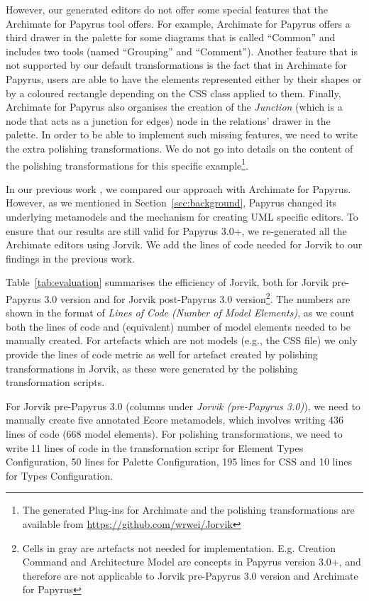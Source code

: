 However, our generated editors do not offer some special features that the Archimate for Papyrus tool offers. 
For example, Archimate for Papyrus offers a third drawer in the palette for some diagrams that is called ``Common'' and includes two tools (named ``Grouping'' and ``Comment''). 
Another feature that is not supported by our default transformations is the fact that in Archimate for Papyrus, users are able to have the elements represented either by their shapes or by a coloured rectangle depending on the CSS class applied to them. 
Finally, Archimate for Papyrus also organises the creation of the \textit{Junction} (which is a node that acts as a junction for edges) node in the relations' drawer in the palette.
In order to be able to implement such missing features, we need to write the extra polishing transformations. 
We do not go into details on the content of the polishing transformations for this specific example\footnote{The generated Plug-ins for Archimate and the polishing transformations are available from \url{https://github.com/wrwei/Jorvik}}.

In our previous work \cite{zolotas2018towards}, we compared our approach with Archimate for Papyrus. 
However, as we mentioned in Section~\ref{sec:background}, Papyrus changed its underlying metamodels and the mechanism for creating UML specific editors. 
To ensure that our results are still valid for Papyrus 3.0+, we re-generated all the Archimate editors using Jorvik. 
We add the lines of code needed for Jorvik to our findings in the previous work.

Table~\ref{tab:evaluation} summarises the efficiency of Jorvik, both for Jorvik pre-Papyrus 3.0 version and for Jorvik post-Papyrus 3.0 version\footnote{Cells in gray are artefacts not needed for implementation. E.g. Creation Command and Architecture Model are concepts in Papyrus version 3.0+, and therefore are not applicable to Jorvik pre-Papyrus 3.0 version and Archimate for Papyrus}. The numbers are shown in the format of \textit{Lines of Code (Number of Model Elements)}, as we count both the lines of code and (equivalent) number of model elements needed to be manually created. For artefacts which are not models (e.g., the CSS file) we only provide the lines of code metric as well for artefact created by polishing transformations in Jorvik, as these were generated by the polishing transformation scripts.

For Jorvik pre-Papyrus 3.0 (columns under \textit{Jorvik (pre-Papyrus 3.0)}), we need to manually create five annotated Ecore metamodels, which involves writing 436 lines of code (668 model elements). 
For polishing transformations, we need to write 11 lines of code in the transfornation scripr for Element Types Configuration, 50 lines for Palette Configuration, 195 lines for CSS and 10 lines for Types Configuration.


